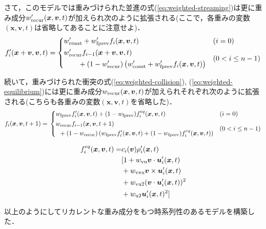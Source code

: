  さて，このモデルでは重みづけられた並進の式(\ref{eq:weighted-streaming})は更に重み成分$w'_{\rm{recur}}(\bm{x}, \bm{v}, t)$が加えられ次のように拡張される(ここで，各重みの変数$(\bm{x}, \bm{v}, t)$は省略してあることに注意せよ)．
\begin{equation}
  f_i'(\bm{x}+\bm{v}, \bm{v}, t) =
  \begin{dcases}
    w'_{\rm{const}} + w'_{\rm{fprev}} f_i(\bm{x}, \bm{v}, t)
    & (i = 0) \\
    \begin{split}
      & w'_{\rm{recur}} f_{i-1}(\bm{x} + \bm{v}, \bm{v}, t) \\
      & \qquad + (1 - w'_{\rm{recur}})
      \left(
        w'_{\rm{const}} + w'_{\rm{fprev}} f_i(\bm{x}, \bm{v}, t)
      \right)
    \end{split}
    & (0 < i \leq n-1)
  \end{dcases}
  \label{eq:weighted-streaming-time-series}
\end{equation}

続いて，重みづけられた衝突の式(\ref{eq:weighted-collision}), (\ref{eq:weighted-equilibrium})には更に重み成分$w_{\rm{recur}}(\bm{x}, \bm{v}, t)$が加えられそれぞれ次のように拡張される(こちらも各重みの変数$(\bm{x}, \bm{v}, t)$を省略した)．
\begin{equation}
  f_i(\bm{x}, \bm{v}, t + 1) = \\
  \begin{dcases}
    w_{\rm{fprev}} f_i'(\bm{x}, \bm{v}, t)
    + (1 - w_{\rm{fprev}}) f_i^{eq}(\bm{x}, \bm{v}, t)
    & (i = 0) \\
    \begin{split}
      & w_{\rm{recur}} f_{i-1}(\bm{x}, \bm{v}, t + 1) \\
      & \hspace{5pt} + (1 - w_{\rm{recur}})
      \left(
        w_{\rm{fprev}} f_i'(\bm{x}, \bm{v}, t)
        + (1 - w_{\rm{fprev}}) f_i^{eq}(\bm{x}, \bm{v}, t)
      \right)
    \end{split}
    & (0 < i \leq n-1)
  \end{dcases}
  \label{eq:weighted-collision-time-series}
\end{equation}

\begin{equation}
\begin{split}
  f_i^{eq}(\bm{x}, \bm{v}, t) =
  &c_i(\bm{v}) \rho_i'(\bm{x}, t) \\
  &[ 1 + w_{\rm{vu}}\bm{v} \cdot \bm{u}_i'(\bm{x}, t) \\
  &+ w_{\rm{vxu}}\bm{v} \times \bm{u}_i'(\bm{x}, t) \\
  &+ w_{\rm{vu2}}(\bm{v} \cdot \bm{u}_i'(\bm{x}, t))^2 \\
  &+ w_{\rm{u2}}\bm{u}_i'(\bm{x}, t)^2 ]
\end{split}
  \label{eq:weighted-equilibrium-time-series}
\end{equation}

以上のようにしてリカレントな重み成分をもつ時系列性のあるモデルを構築した．
